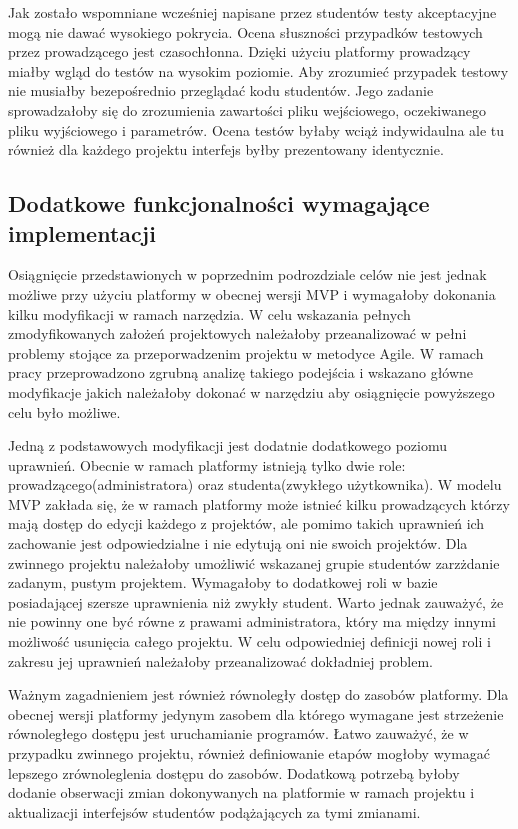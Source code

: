 Jak zostało wspomniane wcześniej napisane przez studentów testy akceptacyjne mogą nie dawać wysokiego pokrycia.
Ocena słuszności przypadków testowych przez prowadzącego jest czasochłonna.
Dzięki użyciu platformy prowadzący miałby wgląd do testów na wysokim poziomie.
Aby zrozumieć przypadek testowy nie musiałby bezepośrednio przeglądać kodu studentów.
Jego zadanie sprowadzałoby się do zrozumienia zawartości pliku wejściowego, oczekiwanego pliku wyjściowego i parametrów.
Ocena testów byłaby wciąż indywidaulna ale tu również dla każdego projektu interfejs byłby prezentowany identycznie.

\subsection{Dodatkowe funkcjonalności wymagające implementacji}
\label{agile_todo}

Osiągnięcie przedstawionych w poprzednim podrozdziale celów nie jest jednak możliwe przy użyciu platformy w obecnej wersji MVP i wymagałoby dokonania kilku modyfikacji w ramach narzędzia.
W celu wskazania pełnych zmodyfikowanych założeń projektowych należałoby przeanalizować w pełni problemy stojące za przeporwadzenim projektu w metodyce Agile.
W ramach pracy przeprowadzono zgrubną analizę takiego podejścia i wskazano główne modyfikacje jakich należałoby dokonać w narzędziu aby osiągnięcie powyższego celu było możliwe.

Jedną z podstawowych modyfikacji jest dodatnie dodatkowego poziomu uprawnień.
Obecnie w ramach platformy istnieją tylko dwie role: prowadzącego(administratora) oraz studenta(zwykłego użytkownika).
W modelu MVP zakłada się, że w ramach platformy może istnieć kilku prowadzących którzy mają dostęp do edycji każdego z projektów, ale pomimo takich uprawnień ich zachowanie jest odpowiedzialne i nie edytują oni nie swoich projektów.
Dla zwinnego projektu należałoby umożliwić wskazanej grupie studentów zarzżdanie zadanym, pustym projektem.
Wymagałoby to dodatkowej roli w bazie posiadającej szersze uprawnienia niż zwykły student.
Warto jednak zauważyć, że nie powinny one być równe z prawami administratora, który ma między innymi możliwość usunięcia całego projektu.
W celu odpowiedniej definicji nowej roli i zakresu jej uprawnień należałoby przeanalizować dokładniej problem.

Ważnym zagadnieniem jest również równoległy dostęp do zasobów platformy.
Dla obecnej wersji platformy jedynym zasobem dla którego wymagane jest strzeżenie równoległego dostępu jest uruchamianie programów.
Łatwo zauważyć, że w przypadku zwinnego projektu, również definiowanie etapów mogłoby wymagać lepszego zrównoleglenia dostępu do zasobów.
Dodatkową potrzebą byłoby dodanie obserwacji zmian dokonywanych na platformie w ramach projektu i aktualizacji interfejsów studentów podążających za tymi zmianami.


